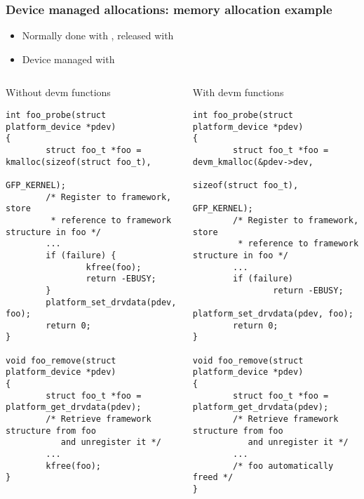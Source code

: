 \begin{frame}[fragile]
  \frametitle{Device managed allocations: memory allocation example}
  \begin{itemize}
  \item Normally done with , released
    with 
  \item Device managed with 
  \end{itemize}

  \begin{columns}
    \begin{block}{Without devm functions}
\fontsize{6}{6}\selectfont
    \begin{verbatim}
int foo_probe(struct platform_device *pdev)
{
        struct foo_t *foo = kmalloc(sizeof(struct foo_t),
                                    GFP_KERNEL);
        /* Register to framework, store
         * reference to framework structure in foo */
        ...
        if (failure) {
                kfree(foo);
                return -EBUSY;
        }
        platform_set_drvdata(pdev, foo);
        return 0;
}

void foo_remove(struct platform_device *pdev)
{
        struct foo_t *foo = platform_get_drvdata(pdev);
        /* Retrieve framework structure from foo
           and unregister it */
        ...
        kfree(foo);
}
    \end{verbatim}
  \end{block}
    \begin{block}{With devm functions}
\fontsize{6}{6}\selectfont
    \begin{verbatim}
int foo_probe(struct platform_device *pdev)
{
        struct foo_t *foo = devm_kmalloc(&pdev->dev,
                           sizeof(struct foo_t),
                           GFP_KERNEL);
        /* Register to framework, store
         * reference to framework structure in foo */
        ...
        if (failure)
                return -EBUSY;
        platform_set_drvdata(pdev, foo);
        return 0;
}

void foo_remove(struct platform_device *pdev)
{
        struct foo_t *foo = platform_get_drvdata(pdev);
        /* Retrieve framework structure from foo
           and unregister it */
        ...
        /* foo automatically freed */
}
    \end{verbatim}
  \end{block}
\end{columns}

\end{frame}

